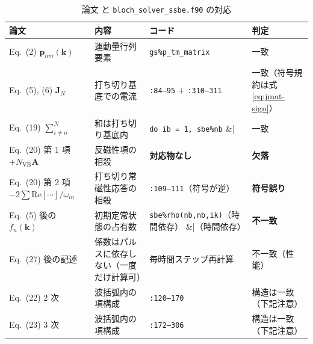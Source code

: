 \documentclass[dvipdfmx,a4paper,11pt]{jsarticle}
\newcommand{\file}[1]{\texttt{#1}}
\newcommand{\vk}{\bm{k}}
\newcommand{\vA}{\bm{A}}
\newcommand{\vp}{\bm{p}}
\newcommand{\Real}{\mathrm{Re}}
\begin{document}
\begin{table}[htbp]
\centering
\caption{論文 \cite{yakovlev2017} と \file{bloch\_solver\_ssbe.f90} の対応}
\label{tab:vlad-map}
\begin{tabular}{@{}p{34mm}p{46mm}p{46mm}p{16mm}@{}}
\toprule
\textbf{論文} & \textbf{内容} & \textbf{コード} & \textbf{判定} \\
\midrule
Eq.~(2) $\vp_{nm}(\vk)$ &
運動量行列要素 &
\file{gs\%p\_tm\_matrix} &
一致 \\[2mm]

Eq.~(5), (6) $\mathbf{J}_N$ &
打ち切り基底での電流 &
\file{:84--95} $+$ \file{:310--311} &
一致\newline（符号規約は式 \eqref{eq:jmat-sign}） \\[2mm]

Eq.~(19) $\sum^{N}_{i\neq n}$ &
和は打ち切り基底内 &
\verb|do ib = 1, sbe%nb| &
一致 \\[2mm]

Eq.~(20) 第 1 項\newline $+N_{\mathrm{VB}}\vA$ &
反磁性項の相殺 &
\textbf{対応物なし} &
\textbf{欠落} \\[2mm]

Eq.~(20) 第 2 項\newline $-2\sum\Real[\cdots]/\omega_{in}$ &
打ち切り常磁性応答の相殺 &
\file{:109--111}\newline（符号が逆） &
\textbf{符号誤り} \\[2mm]

Eq.~(5) 後の $f_n(\vk)$ &
初期定常状態の占有数 &
\verb|sbe%rho(nb,nb,ik)|\newline（時間依存） &
\textbf{不一致} \\[2mm]

Eq.~(27) 後の記述 &
係数はパルスに依存しない\newline（一度だけ計算可） &
毎時間ステップ再計算 &
不一致\newline（性能） \\[2mm]

Eq.~(22) 2 次 &
波括弧内の項構成 &
\file{:120--170} &
構造は一致\newline（下記注意） \\[2mm]

Eq.~(23) 3 次 &
波括弧内の項構成 &
\file{:172--306} &
構造は一致\newline（下記注意） \\
\bottomrule
\end{tabular}
\end{table}
\end{document}
